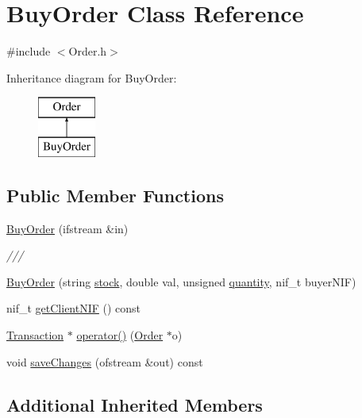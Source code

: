 \hypertarget{class_buy_order}{}\section{Buy\+Order Class Reference}
\label{class_buy_order}


{\ttfamily \#include $<$Order.\+h$>$}

Inheritance diagram for Buy\+Order\+:\begin{figure}[H]
\begin{center}
\leavevmode
\includegraphics[height=2.000000cm]{class_buy_order}
\end{center}
\end{figure}
\subsection*{Public Member Functions}
\begin{DoxyCompactItemize}
\item 
\hyperlink{class_buy_order_acbf093767d9d108b9448f2eefb5f58cd}{Buy\+Order} (ifstream \&in)
\begin{DoxyCompactList}\small\item\em /// \end{DoxyCompactList}\item 
\hyperlink{class_buy_order_a1fcd1c4a28acdf04bfdf99c5b16b4e7d}{Buy\+Order} (string \hyperlink{class_order_aafb6dfab2a1c253eefd78840b27dcd2e}{stock}, double val, unsigned \hyperlink{class_order_ab02e2baeb8c57217a20c9124df3ba11d}{quantity}, nif\+\_\+t buyer\+N\+IF)
\item 
nif\+\_\+t \hyperlink{class_buy_order_ab79597b9bf0656216b2283bfa3a650e0}{get\+Client\+N\+IF} () const
\item 
\hyperlink{class_transaction}{Transaction} $\ast$ \hyperlink{class_buy_order_a45641eed13ea191fff675745a618b9f5}{operator()} (\hyperlink{class_order}{Order} $\ast$o)
\item 
void \hyperlink{class_buy_order_aa4f087d0dbc1f6e8937c0b3679fc2f7b}{save\+Changes} (ofstream \&out) const
\end{DoxyCompactItemize}
\subsection*{Additional Inherited Members}


